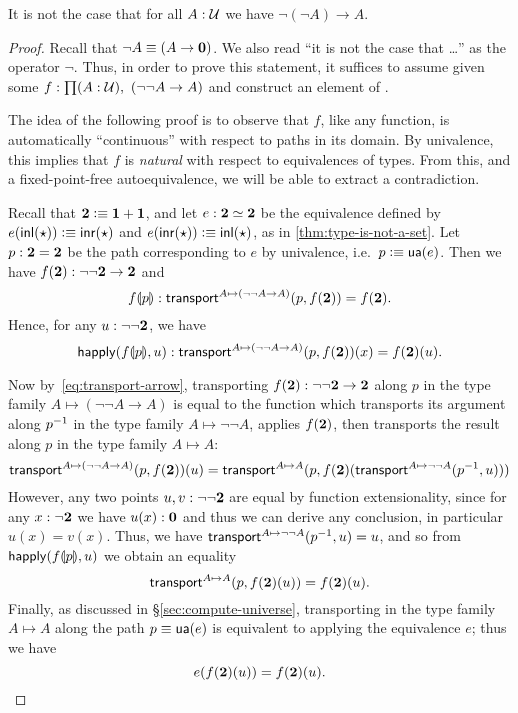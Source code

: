 \begin{thm}\label{thm:not-dneg}
  It is not the case that for all $A:\mathcal{U}$ we have $\neg(\neg A) \to A$.
\end{thm}
\begin{proof}
  Recall that $\neg A \equiv (A\to\mathbf{0})$.
  We also read ``it is not the case that \dots'' as the operator $\neg$.
  Thus, in order to prove this statement, it suffices to assume given some $f:\prd{A:\UU} (\neg\neg A \to A)$ and construct an element of \emptyt.

  The idea of the following proof is to observe that $f$, like any function, is automatically ``continuous'' with respect to paths in its domain.
  By univalence, this implies that $f$ is \emph{natural} with respect to equivalences of types.
  From this, and a fixed-point-free autoequivalence, we will be able to extract a contradiction.

  Recall that $\mathbf{2}\vcentcolon\equiv \mathbf{1}+\mathbf{1}$, and let $e:\mathbf{2} \simeq \mathbf{2}$ be the equivalence defined by $e(\mathsf{inl}(\star))\vcentcolon\equiv\mathsf{inr}(\star)$ and $e(\mathsf{inr}(\star))\vcentcolon\equiv\mathsf{inl}(\star)$, as in \autoref{thm:type-is-not-a-set}.
  Let $p:\mathbf{2}=\mathbf{2}$ be the path corresponding to $e$ by univalence, i.e.\ $p\vcentcolon\equiv \mathsf{ua}(e)$.
  Then we have $f(\mathbf{2}) : \neg\neg\mathbf{2} \to\mathbf{2}$ and
  \[{f}\llparenthesis{p}\rrparenthesis : \mathsf{transport}^{A\mapsto (\neg\neg A \to A)}(p,f(\mathbf{2})) = f(\mathbf{2}).\]
  Hence, for any $u:\neg\neg\mathbf{2}$, we have
  \[\mathsf{happly}({f}\llparenthesis{p}\rrparenthesis,u) : \mathsf{transport}^{A\mapsto (\neg\neg A \to A)}(p,f(\mathbf{2}))(x) = f(\mathbf{2})(u).\]

  Now by~\eqref{eq:transport-arrow}, transporting $f(\mathbf{2}):\neg\neg\mathbf{2}\to\mathbf{2}$ along $p$ in the type family ${A\mapsto (\neg\neg A \to A)}$ is equal to the function which transports its argument along $\mathord{{p}^{-1}}$ in the type family $A\mapsto \neg\neg A$, applies $f(\mathbf{2})$, then transports the result along $p$ in the type family $A\mapsto A$:
  \[ \mathsf{transport}^{A\mapsto (\neg\neg A \to A)}(p,f(\mathbf{2}))(u) =
  \mathsf{transport}^{A\mapsto A}(p,f(\mathbf{2}) (\mathsf{transport}^{A\mapsto \neg\neg A}(\mathord{{p}^{-1}},u)))
  \]
  However, any two points $u,v:\neg\neg\mathbf{2}$ are equal by function extensionality, since for any $x:\neg\mathbf{2}$ we have $u(x):\mathbf{0}$ and thus we can derive any conclusion, in particular $u(x)=v(x)$.
  Thus, we have $\mathsf{transport}^{A\mapsto \neg\neg A}(\mathord{{p}^{-1}},u) = u$, and so from $\mathsf{happly}({f}\llparenthesis{p}\rrparenthesis,u)$ we obtain an equality
  \[ \mathsf{transport}^{A\mapsto A}(p,f(\mathbf{2})(u)) = f(\mathbf{2})(u).\]
  Finally, as discussed in \S\ref{sec:compute-universe}, transporting in the type family $A\mapsto A$ along the path $p\equiv \mathsf{ua}(e)$ is equivalent to applying the equivalence $e$; thus we have
  \begin{equation}
    e(f(\mathbf{2})(u)) = f(\mathbf{2})(u).\label{eq:fpaut}
  \end{equation}


\end{proof}
